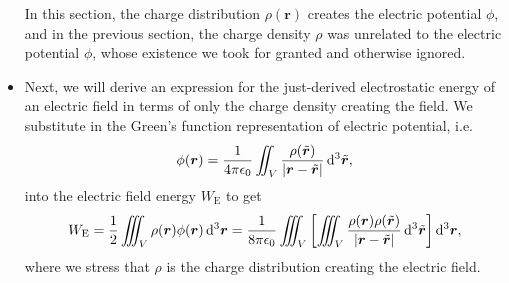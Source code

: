 \documentclass[11pt, a4paper]{article}
\newcommand{\diff}{\mathop{}\!\mathrm{d}} %
\newcommand{\dr}{\diff^{3} \r}  %
\newcommand{\dtr}{\diff^{3} \tilde{\r}}  %
\renewcommand{\vec}[1]{\bm{#1}} %
\renewcommand{\t}[1]{\tilde{#1}} %
\renewcommand{\r}{\vec{r}}
\newcommand{\ee}{\epsilon_{0}}  %
\begin{document}
\begin{itemize}
	In this section, the charge distribution $ \rho(\r) $ creates the electric potential $ \phi $, and in the previous section, the charge density $ \rho $ was unrelated to the electric potential $ \phi $, whose existence we took for granted and otherwise ignored.
	
	\item Next, we will derive an expression for the just-derived electrostatic energy of an electric field in terms of only the charge density creating the field. We substitute in the Green's function representation of electric potential, i.e.
	\begin{equation*}
		\phi(\r) = \frac{1}{4\pi \ee}\iint_{V} \frac{\rho(\t{\r})}{\abs{\r - \t{\r}}} \dtr,
	\end{equation*}
	into the electric field energy $ W_{\text{E}} $ to get
	\begin{equation*}
		W_{\text{E}} = \frac{1}{2} \iiint_{V} \rho(\r) \phi(\r) \dr = \frac{1}{8 \pi \ee} \iiint_{V} \left[\iiint_{V} \frac{\rho(\r) \rho(\t{\r})}{\abs{\r - \t{\r}}} \dtr\right] \dr,
	\end{equation*}
	where we stress that $ \rho $ is the charge distribution creating the electric field.
\end{itemize}
\end{document}
